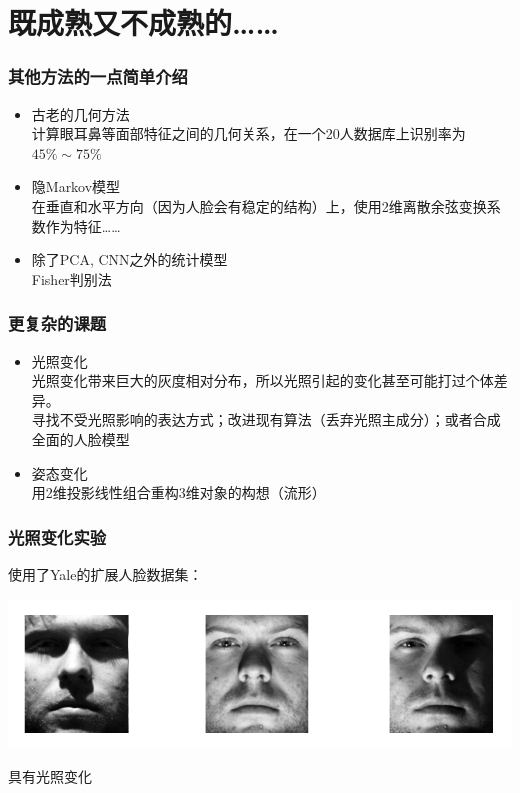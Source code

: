 \documentclass[24pt]{beamer}
\begin{document}
\section{既成熟又不成熟的……}
\begin{frame}
\frametitle{其他方法的一点简单介绍}
\begin{itemize}
\item 古老的几何方法\\
计算眼耳鼻等面部特征之间的几何关系，在一个20人数据库上识别率为$45\% \sim 75\%$\\
\item 隐Markov模型\\
在垂直和水平方向（因为人脸会有稳定的结构）上，使用2维离散余弦变换系数作为特征……\\
\item 除了PCA, CNN之外的统计模型\\
Fisher判别法
\end{itemize}
\end{frame}
\begin{frame}
\frametitle{更复杂的课题}
\begin{itemize}
\item 光照变化\\
光照变化带来巨大的灰度相对分布，所以光照引起的变化甚至可能打过个体差异。\\
寻找不受光照影响的表达方式；改进现有算法（丢弃光照主成分）；或者合成全面的人脸模型
\item 姿态变化\\
用2维投影线性组合重构3维对象的构想（流形）
\end{itemize}
\end{frame}
\begin{frame}
\frametitle{光照变化实验}
使用了Yale的扩展人脸数据集：
\begin{center}
\includegraphics[width=1\linewidth]{./fig25.png}
\end{center}
具有光照变化
\end{frame}
\end{document}
